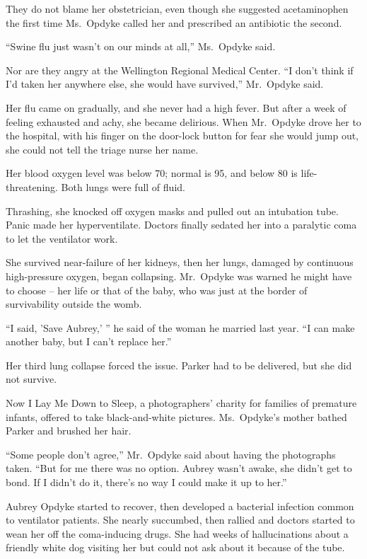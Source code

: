﻿\documentclass[12pt]{article}
\begin{document}
They do not blame her obstetrician\cite{obstetrician}, even though she suggested acetaminophen the
first time Ms.~Opdyke called her and prescribed an antibiotic the second.

``Swine flu just wasn't on our minds at all,'' Ms.~Opdyke said.

Nor are they angry at the Wellington Regional Medical Center. ``I don't think if I'd taken her
anywhere else, she would have survived,'' Mr.~Opdyke said.

Her flu came on gradually, and she never had a high fever. But after a week of feeling exhausted and
achy, she became delirious. When Mr.~Opdyke drove her to the hospital, with his finger on the
door-lock button for fear she would jump out, she could not tell the triage nurse her name.

Her blood oxygen level was below 70; normal is 95, and below 80 is life-threatening. Both lungs were
full of fluid.

Thrashing, she knocked off oxygen masks and pulled out an intubation tube. Panic made her
hyperventilate. Doctors finally sedated her into a paralytic coma to let the ventilator work.

She survived near-failure of her kidneys, then her lungs, damaged by continuous high-pressure
oxygen, began collapsing. Mr.~Opdyke was warned he might have to choose -- her life or that of the
baby, who was just at the border of survivability outside the womb.

``I said, 'Save Aubrey,' '' he said of the woman he married last year. ``I can make another baby,
but I can't replace her.''

Her third lung collapse forced the issue. Parker had to be delivered, but she did not survive.

Now I Lay Me Down to Sleep, a photographers' charity for families of premature infants, offered to
take black-and-white pictures. Ms.~Opdyke's mother bathed Parker and brushed her hair.

``Some people don't agree,'' Mr.~Opdyke said about having the photographs taken. ``But for me there
was no option. Aubrey wasn't awake, she didn't get to bond. If I didn't do it, there's no way I
could make it up to her.''

Aubrey Opdyke started to recover, then developed a bacterial infection common to ventilator
patients. She nearly succumbed, then rallied and doctors started to wean her off the coma-inducing
drugs. She had weeks of hallucinations about a friendly white dog visiting her but could not ask
about it because of the tube.
\end{document}
